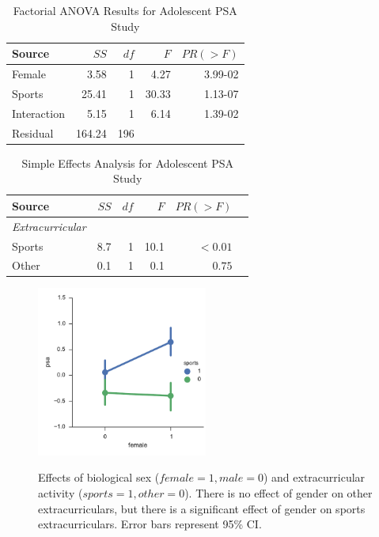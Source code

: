 \documentclass[onecolumn,10pt]{jhwhw}
\begin{document}
\begin{table}[h!]
\begin{center}
\begin{tabular}{lrrrr}
\toprule
Source        &   $SS$ & $df$ &  $F$ &       $PR(>F)$ \\
\midrule
Female        &   3.58 &   1 &  4.27 &      3.99-02 \\
Sports        &  25.41 &   1 & 30.33 &      1.13-07 \\
Interaction   &   5.15 &   1 &  6.14 &      1.39-02 \\
Residual      & 164.24 & 196 &       &           \\
\bottomrule
\end{tabular}
\end{center}
\caption{Factorial ANOVA Results for Adolescent PSA Study}
\label{psa1}
\end{table}

\begin{table}[htdp]
\begin{center}
\begin{tabular}{l r r r r r}
\toprule
Source & $SS$ & $df$ & $F$ & $PR(>F)$ \\
\midrule
\it{Extracurricular} & & & & \\
\hspace{1em} Sports   & 8.7 &  1  & 10.1 & $<0.01$ \\
\hspace{1em} Other    & 0.1 &  1  &  0.1 & $0.75$\\
\bottomrule
\end{tabular}
\end{center}
\caption{Simple Effects Analysis for Adolescent PSA Study}
\label{psa2}
\end{table}

\begin{figure}[h!]
\begin{center}
\includegraphics[width=0.5\textwidth]{p3.pdf}
\label{fig:on}
\end{center}
\caption{Effects of biological sex ($female=1, male=0$) and extracurricular activity ($sports=1, other=0$). There is no effect of gender on other extracurriculars, but there is a significant effect of gender on sports extracurriculars. Error bars represent 95\% CI.}
\end{figure}
\end{document}
